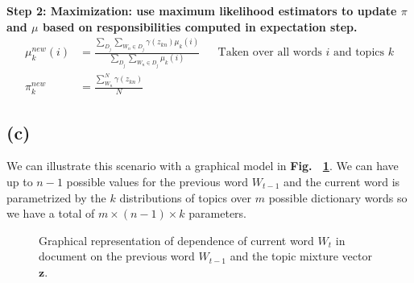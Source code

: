 \documentclass[11pt]{amsart}
\newcommand{\vek}[1]{\mathbf{#1}}
\begin{document}
{\bf Step 2: Maximization: use maximum likelihood estimators to update $\pi$ and $\mu$ based on responsibilities computed in expectation step.}\\


\begin{equation}
\begin{aligned}
\mu_{k}^{new}(i) &= \frac{\sum_{D_j }\sum_{W_n \in D_j} \gamma(z_{kn}) \mu_{k}(i)}{\sum_{D_j} \sum_{W_n \in D_j}  \mu_{k}(i)} && \text{Taken over all words $i$ and topics $k$}\\
\pi_{k}^{new} &= \frac{\sum_{W_n}^{N} \gamma(z_{kn})}{N}
\end{aligned}
\end{equation}

\subsection{(c)}

We can illustrate this scenario with a graphical model in {\bf Fig. ~\ref{fig:graph}}. We can have up to $n-1$ possible values for the previous word $W_{t-1}$ and the current word is parametrized by the $k$ distributions of topics over $m$ possible dictionary words so we have a total of $m \times (n-1) \times k$ parameters.

\begin{figure}
\caption{Graphical representation of dependence of current word $W_t$ in document on the previous word $W_{t-1}$ and the topic mixture vector $\vek{z}$.}
\label{fig:graph}
\end{figure}






\end{document}

